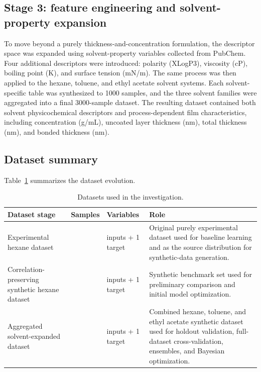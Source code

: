 \documentclass[11pt]{article}
\begin{document}
\subsection{Stage 3: feature engineering and solvent-property expansion}

To move beyond a purely thickness-and-concentration formulation, the descriptor space was expanded using solvent-property variables collected from PubChem\cite{kim2023}. Four additional descriptors were introduced: polarity (XLogP3), viscosity (cP), boiling point (K), and surface tension (mN/m).
The same process was then applied to the hexane, toluene, and ethyl acetate solvent systems. Each solvent-specific table was synthesized to 1000 samples, and the three solvent families were aggregated into a final 3000-sample dataset. The resulting dataset contained both solvent physicochemical descriptors and process-dependent film characteristics, including concentration (g/mL), uncoated layer thickness (nm), total thickness (nm), and bonded thickness (nm).

\subsection{Dataset summary}
Table~\ref{tab:datasets} summarizes the dataset evolution.

\begin{table}[H]
\centering
\caption{Datasets used in the investigation.}
\label{tab:datasets}
\begin{tabularx}{\linewidth}{>{\raggedright\arraybackslash}p{3.1cm} >{\centering\arraybackslash}p{1.5cm} >{\centering\arraybackslash}p{1.7cm} X}
\toprule
Dataset stage & Samples & Variables & Role \\
\midrule
Experimental hexane dataset & 58 & 3 inputs + 1 target & Original purely experimental dataset used for baseline learning and as the source distribution for synthetic-data generation. \\
Correlation-preserving synthetic hexane dataset & 1000 & 3 inputs + 1 target & Synthetic benchmark set used for preliminary comparison and initial model optimization. \\
Aggregated solvent-expanded dataset & 3000 & 7 inputs + 1 target & Combined hexane, toluene, and ethyl acetate synthetic dataset used for holdout validation, full-dataset cross-validation, ensembles, and Bayesian optimization. \\
\bottomrule
\end{tabularx}
\end{table}
\end{document}
